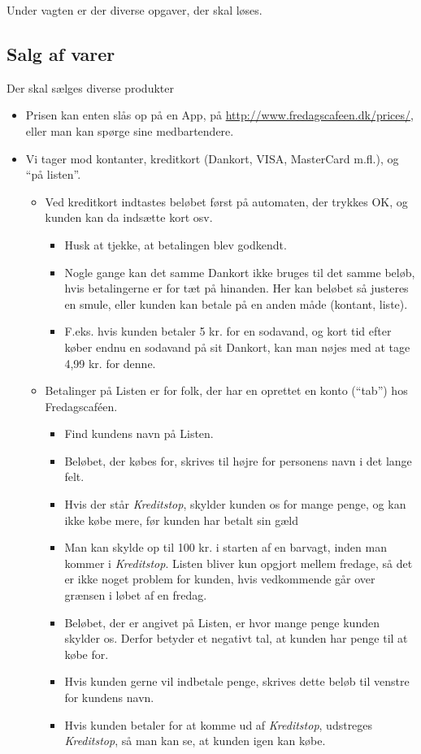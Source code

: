 Under vagten er der diverse opgaver, der skal løses.

\subsection{Salg af varer}
\label{sec:intra:salg}

Der skal sælges diverse produkter
\begin{itemize}
\item Prisen kan enten slås op på en App, på
  \url{http://www.fredagscafeen.dk/prices/}, eller man kan spørge
  sine medbartendere.
\item Vi tager mod kontanter, kreditkort (Dankort, VISA, MasterCard
  m.fl.), og ``på listen''.
  \begin{itemize}
  \item Ved kreditkort indtastes beløbet først på automaten, der
    trykkes OK, og kunden kan da indsætte kort osv.
    \begin{itemize}
    \item Husk at tjekke, at betalingen blev godkendt.
    \item Nogle gange kan det samme Dankort ikke bruges til det samme
      beløb, hvis betalingerne er for tæt på hinanden. Her kan beløbet
      så justeres en smule, eller kunden kan betale på en anden måde
      (kontant, liste).
    \item F.eks. hvis kunden betaler 5 kr. for en sodavand, og kort
      tid efter køber endnu en sodavand på sit Dankort, kan man nøjes
      med at tage 4,99 kr. for denne.
    \end{itemize}
  \item Betalinger på Listen er for folk, der har en oprettet en konto
    (``tab'') hos Fredagscaféen.
    \begin{itemize}
    \item Find kundens navn på Listen.
    \item Beløbet, der købes for, skrives til højre for personens navn
      i det lange felt.
    \item Hvis der står \emph{Kreditstop}, skylder kunden os for mange
      penge, og kan ikke købe mere, før kunden har betalt sin gæld
    \item Man kan skylde op til 100 kr. i starten af en barvagt, inden
      man kommer i \emph{Kreditstop}. Listen bliver kun opgjort mellem
      fredage, så det er ikke noget problem for kunden, hvis
      vedkommende går over grænsen i løbet af en fredag.
    \item Beløbet, der er angivet på Listen, er hvor mange penge
      kunden skylder os. Derfor betyder et negativt tal, at kunden har
      penge til at købe for.
    \item Hvis kunden gerne vil indbetale penge, skrives dette beløb
      til venstre for kundens navn.
    \item Hvis kunden betaler for at komme ud af \emph{Kreditstop},
      udstreges \emph{Kreditstop}, så man kan se, at kunden igen kan
      købe.
    \end{itemize}
  \end{itemize}
\end{itemize}


